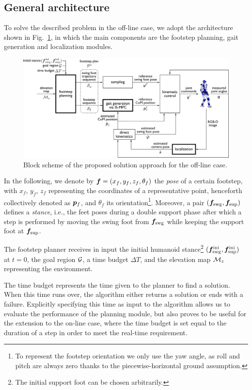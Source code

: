 \subsection{General architecture}
\label{sec:WoS:offlineCase:GeneralArchitecture}
To solve the described problem in the off-line case, we adopt the architecture
shown in Fig.~\ref{fig:WoS:blockScheme1}, in which the main components are the
footstep planning, gait generation and localization modules.

\begin{figure}
    \centering
    \includegraphics[width=\textwidth]{figures/BlockSchemeOffline.pdf}
    \caption{Block scheme of the proposed solution approach for the off-line case.}
    \label{fig:WoS:blockScheme1}
\end{figure}

In the following, we denote by ${\bm{f}} = (x_{f}, y_{f}, z_{f}, \theta_{f})$ the
{\em pose} of a certain footstep, with $x_{f}$, $y_{f}$, $z_{f}$ representing
the coordinates of a representative point, henceforth collectively denoted as
${\bm{p}}_f$, and $\theta_{f}$ its orientation\footnote{To represent the footstep
orientation we only use the yaw angle, as roll and pitch are always zero thanks
to the piecewise-horizontal ground assumption.}.
Moreover, a pair $({\bm{f}}_{\rm swg}, {\bm{f}}_{\rm sup})$ defines a {\em stance},
i.e., the feet poses during a double support phase after which a step is
performed by moving the swing foot from ${\bm{f}}_{\rm swg}$ while keeping the
support foot at ${\bm{f}}_{\rm sup}$. 

The footstep planner receives in input the initial humanoid
stance\footnote{The initial support foot can be chosen arbitrarily.}
$({\bm{f}}_{\rm swg}^{\rm ini}, {\bm{f}}_{\rm sup}^{\rm ini})$ at $t=0$, the goal
region $\cal G$, a time budget $\Delta T$, and the elevation map ${\cal M}_z$
representing the environment.

The time budget represents the time given to the planner to find a solution.
When this time runs over, the algorithm either returns a solution or ends
with a failure. Explicitly specifying this time as input to the algorithm
allows us to evaluate the performance of the planning module, but also proves
to be useful for the extension to the on-line case, where the time budget is
set equal to the duration of a step in order to meet the real-time requirement.

